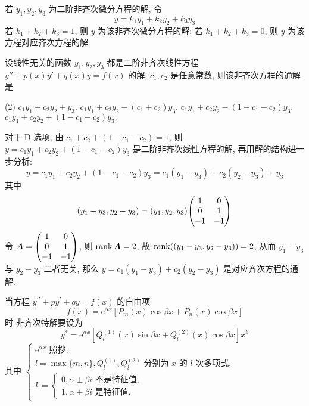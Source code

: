 \begin{theorem}[二阶常系数非齐次线性微分方程解的性质]
    若 $y_1, y_2, y_3$ 为二阶非齐次微分方程的解, 令 $$
        y=k_1y_1 +k_2y_2 +k_3y_3
    $$
    若 $k_1+ k_2+ k_3=1$, 则 $y$ 为该非齐次微分方程的解; 若 $k_1+ k_2+ k_3=0$, 则 $y$ 为该方程对应齐次方程的解.
\end{theorem}

\begin{example}
    设线性无关的函数 $y_1, y_2, y_3$ 都是二阶非齐次线性方程 $y''+p(x)y'+q(x)y=f(x)$ 的解, $c_1,c_2$ 是任意常数,
    则该非齐次方程的通解是
    \begin{tasks}(2)
        \task $c_1y_1+c_2y_2+y_3.$
        \task $c_1y_1+c_2y_2-(c_1+c_2)y_3.$
        \task $c_1y_1+c_2y_2-(1-c_1-c_2)y_3.$
        \task $c_1y_1+c_2y_2+(1-c_1-c_2)y_3.$
    \end{tasks}
\end{example}
\begin{solution}
    对于 D 选项, 由 $c_1+c_2+(1-c_1-c_2)=1$, 则 $y=c_1y_1+c_2y_2+(1-c_1-c_2)y_3$ 是二阶非齐次线性方程的解, 再用解的结构进一步分析:
    $$
        y=c_1y_1+c_2y_2+(1-c_1-c_2)y_3=c_1(y_1-y_3)+c_2(y_2-y_3)+y_3
    $$
    其中 $$
        (y_1-y_3,y_2-y_3)=(y_1, y_2, y_3)\mqty(1&0\\ 0&1\\ -1&-1)
    $$
    令 $\vb*{A}=\mqty(1&0\\ 0&1\\ -1&-1)$, 则 $\rank\vb*{A}=2$, 故 $\rank((y_1-y_3,y_2-y_3))=2$, 从而 $y_1-y_3$ 与 $y_2-y_3$ 二者无关, 那么 $y=c_1(y_1-y_3)+c_2(y_2-y_3)$ 是对应齐次方程的通解.
\end{solution}

\begin{theorem}
    当方程 $ y^{\prime \prime}+p y^{\prime}+q y=f(x) $ 的自由项
    $$f(x)=\mathrm{e}^{\alpha x}\left[P_{m}(x) \cos \beta x+P_{n}(x) \cos \beta x\right] $$ 时
    非齐次特解要设为
    $$y^{*}=\mathrm{e}^{\alpha x}\left[Q_{l}^{(1)}(x) \sin \beta x+Q_{l}^{(2)}(x) \cos \beta x\right] x^{k}$$
    其中 $\begin{cases}
        \mathrm{e}^{\alpha x} \text { 照抄,  } \\ l=\max \{m, n\}, Q_{l}^{(1)}, Q_{l}^{(2)} \text { 分别为 } x \text { 的 } l \text { 次多项式,  } \\ k=\begin{cases}
            0, \alpha \pm \beta i \text { 不是特征值,  } \\ 1, \alpha \pm \beta i \text { 是特征值. }
        \end{cases}
    \end{cases}$
\end{theorem}

